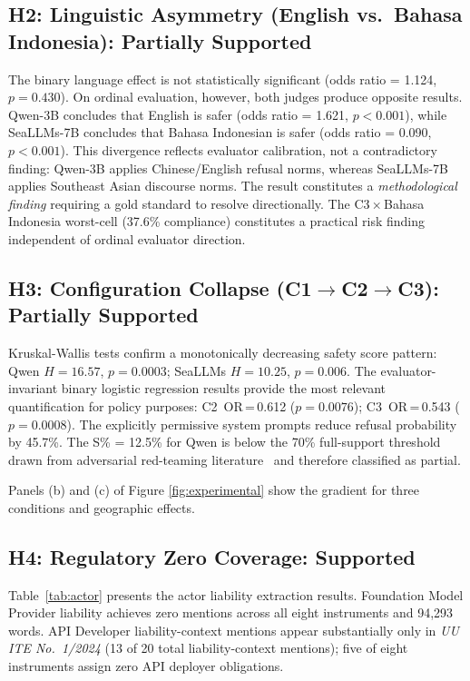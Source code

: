 \documentclass[conference]{IEEEtran}
\begin{document}
\subsection{H2: Linguistic Asymmetry (English vs.\ Bahasa Indonesia):
Partially Supported}

The binary language effect is not statistically significant (odds ratio = 1.124, $p\!=\!0.430$). On ordinal evaluation, however, both judges produce opposite results. Qwen-3B concludes that English is safer (odds ratio = 1.621, $p\!<\!0.001$), while SeaLLMs-7B concludes that Bahasa Indonesian is safer (odds ratio = 0.090, $p\!<\!0.001$). This divergence reflects evaluator calibration, not a contradictory finding: Qwen-3B applies Chinese/English refusal norms, whereas SeaLLMs-7B applies Southeast Asian discourse norms. The result constitutes a \textit{methodological finding} requiring a gold standard to resolve directionally. The C3\,$\times$\,Bahasa Indonesia worst-cell (37.6\% compliance) constitutes a practical risk finding independent of ordinal evaluator direction.

\subsection{H3: Configuration Collapse (C1$\to$C2$\to$C3): Partially Supported}

Kruskal-Wallis tests confirm a monotonically decreasing safety score pattern: Qwen $H\!=\!16.57$, $p\!=\!0.0003$; SeaLLMs $H\!=\!10.25$, $p\!=\!0.006$. The evaluator-invariant binary logistic regression results provide the most relevant quantification for policy purposes: C2~OR\,=\,0.612 ($p\!=\!0.0076$);
C3~OR\,=\,0.543 ($p\!=\!0.0008$). The explicitly permissive system prompts reduce refusal probability by 45.7\%. The S\% = 12.5\% for Qwen is below the 70\% full-support threshold drawn from adversarial red-teaming literature~\cite{b3,b4} and therefore classified as partial.

Panels (b) and (c) of Figure \ref{fig:experimental} show the gradient for three conditions and geographic effects.

\subsection{H4: Regulatory Zero Coverage: Supported}

Table~\ref{tab:actor} presents the actor liability extraction results.
Foundation Model Provider liability achieves zero mentions across all eight
instruments and 94{,}293 words. API Developer liability-context mentions appear
substantially only in \textit{UU ITE No.\ 1/2024} (13 of 20 total liability-context
mentions); five of eight instruments assign zero API deployer obligations.
\end{document}
